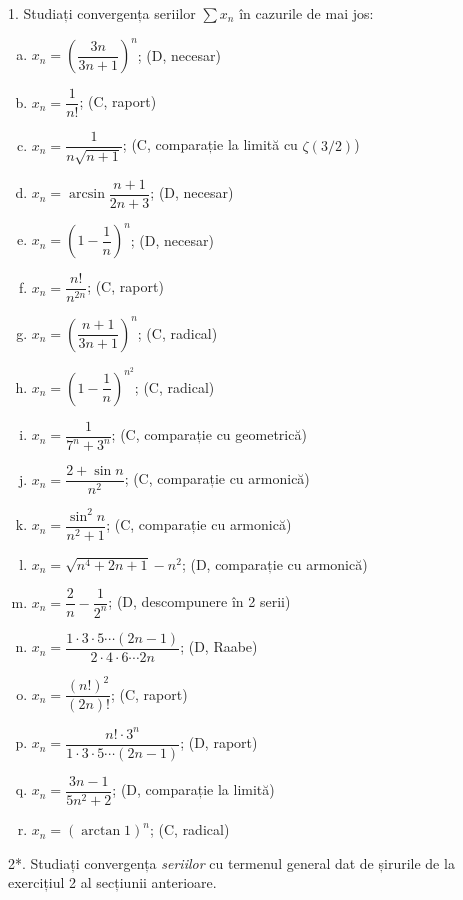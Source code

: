 1. Studiați convergența seriilor $ \sum x_n $ în cazurile de mai jos:
\begin{enumerate}[(a)]
    \item $ x_n = \left( \dfrac{3n}{3n + 1} \right)^n $; \hfill(D, necesar)
    \item $ x_n = \dfrac{1}{n!} $; \hfill(C, raport)
    \item $ x_n = \dfrac{1}{n\sqrt{n + 1}} $; \hfill(C, comparație la limită cu $\zeta(3/2)$)
    \item $ x_n = \arcsin \dfrac{n+1}{2n + 3} $; \hfill(D, necesar)
    \item $ x_n = \left( 1 - \dfrac{1}{n} \right)^n $; \hfill(D, necesar)
    \item $ x_n = \dfrac{n!}{n^{2n}} $; \hfill(C, raport)
    \item $ x_n = \left( \dfrac{n + 1}{3n + 1}\right)^n $; \hfill(C, radical)
    \item $ x_n = \left( 1 - \dfrac{1}{n} \right)^{n^2} $; \hfill(C, radical)
    \item $ x_n = \dfrac{1}{7^n + 3^n} $; \hfill(C, comparație cu geometrică)
    \item $ x_n = \dfrac{2 + \sin n}{n^2} $; \hfill(C, comparație cu armonică)
    \item $ x_n = \dfrac{\sin^2 n}{n^2 + 1} $; \hfill(C, comparație cu armonică)
    \item $ x_n = \sqrt{n^4 + 2n + 1} - n^2 $; \hfill(D, comparație cu armonică)
    \item $ x_n = \dfrac{2}{n} - \dfrac{1}{2^n} $; \hfill(D, descompunere în 2 serii)
    \item $ x_n = \dfrac{1 \cdot 3 \cdot 5 \cdots (2n - 1)}{2 \cdot 4 \cdot 6 \cdots 2n} $; \hfill(D, Raabe)
    \item $ x_n = \dfrac{(n!)^2}{(2n)!} $; \hfill(C, raport)
    \item $ x_n = \dfrac{n! \cdot 3^n}{1 \cdot 3 \cdot 5 \cdots (2n - 1) } $; \hfill(D, raport)
    \item $ x_n = \dfrac{3n - 1}{5n^2 + 2} $; \hfill(D, comparație la limită)
    \item $ x_n = (\arctan 1)^n $; \hfill(C, radical)
\end{enumerate}

\vspace{1cm}

2*. Studiați convergența \emph{seriilor} cu termenul general dat de șirurile de
la exercițiul 2 al secțiunii anterioare.


